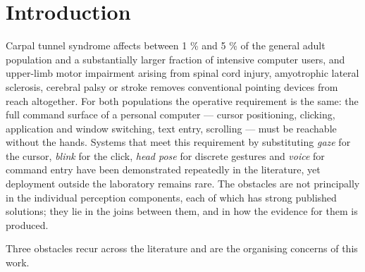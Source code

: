 \FloatBarrier

\section{Introduction}

Carpal tunnel syndrome affects between 1 \% and 5 \% of the general adult population  and a substantially larger fraction of intensive computer users, and upper-limb motor impairment arising from spinal cord injury, amyotrophic lateral sclerosis, cerebral palsy or stroke removes conventional pointing devices from reach altogether. For both populations the operative requirement is the same: the full command surface of a personal computer --- cursor positioning, clicking, application and window switching, text entry, scrolling --- must be reachable without the hands. Systems that meet this requirement by substituting \emph{gaze} for the cursor, \emph{blink} for the click, \emph{head pose} for discrete gestures and \emph{voice} for command entry have been demonstrated repeatedly in the literature, yet deployment outside the laboratory remains rare. The obstacles are not principally in the individual perception components, each of which has strong published solutions; they lie in the joins between them, and in how the evidence for them is produced.

Three obstacles recur across the literature and are the organising concerns of this work.

